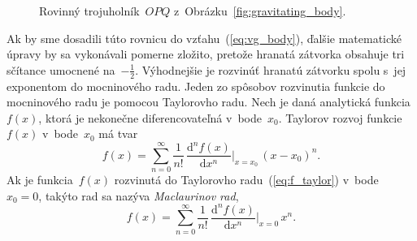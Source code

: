 \documentclass[a4paper, 12pt]{book}
\newcommand{\diff}{\mathrm d}
\begin{document}
\begin{figure}
\centering

\caption{Rovinný trojuholník~$OPQ$ z~Obrázku~\ref{fig:gravitating_body}.}
\label{fig:distance_l}
\end{figure}

Ak by sme dosadili túto rovnicu do vzťahu~(\ref{eq:vg_body}), ďalšie
matematické úpravy by sa vykonávali pomerne zložito, pretože hranatá zátvorka
obsahuje tri sčítance umocnené na~$-\frac{1}{2}$.  Výhodnejšie je rozvinúť
hranatú zátvorku spolu s~jej exponentom do mocninového radu.  Jeden zo spôsobov
rozvinutia funkcie do mocninového radu je pomocou Taylorovho radu.  Nech je 
daná analytická funkcia~$f(x)$, ktorá je nekonečne diferencovateľná 
v~bode~$x_0$.  Taylorov rozvoj funkcie~$f(x)$ v~bode~$x_0$ má tvar
%
\begin{equation}
\label{eq:f_taylor}
f(x) = \sum_{n = 0}^\infty \frac{1}{n!} \, \frac{\diff^n f(x)}{\diff x^n} 
\bigg\lvert_{x = x_0} \, (x - x_0)^n{.}
\end{equation}
%
Ak je funkcia~$f(x)$ rozvinutá do Taylorovho radu~(\ref{eq:f_taylor}) 
v~bode~$x_0 = 0$, takýto rad sa nazýva \emph{Maclaurinov rad},
%
\begin{equation}
f(x) = \sum_{n = 0}^\infty \frac{1}{n!} \, \frac{\diff^n f(x)}{\diff x^n} 
\bigg\lvert_{x = 0} \, x^n{.}
\end{equation}
\end{document}
